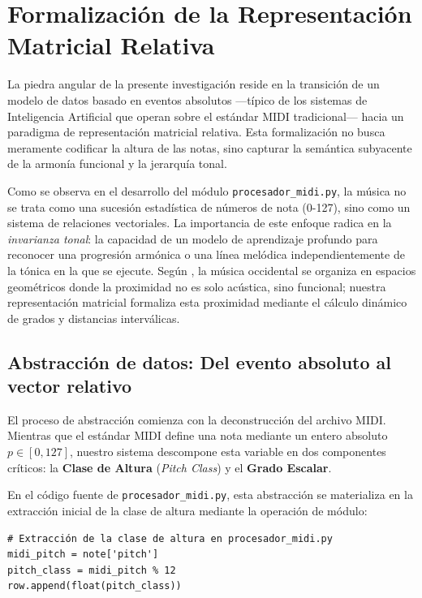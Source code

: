 \section{Formalización de la Representación Matricial Relativa}

La piedra angular de la presente investigación reside en la transición de un modelo de datos basado en eventos absolutos —típico de los sistemas de Inteligencia Artificial que operan sobre el estándar MIDI tradicional— hacia un paradigma de representación matricial relativa. Esta formalización no busca meramente codificar la altura de las notas, sino capturar la semántica subyacente de la armonía funcional y la jerarquía tonal. 

Como se observa en el desarrollo del módulo \texttt{procesador\_midi.py}, la música no se trata como una sucesión estadística de números de nota (0-127), sino como un sistema de relaciones vectoriales. La importancia de este enfoque radica en la \textit{invarianza tonal}: la capacidad de un modelo de aprendizaje profundo para reconocer una progresión armónica o una línea melódica independientemente de la tónica en la que se ejecute. Según \cite{tymoczko2011}, la música occidental se organiza en espacios geométricos donde la proximidad no es solo acústica, sino funcional; nuestra representación matricial formaliza esta proximidad mediante el cálculo dinámico de grados y distancias interválicas.

\subsection{Abstracción de datos: Del evento absoluto al vector relativo}

El proceso de abstracción comienza con la deconstrucción del archivo MIDI. Mientras que el estándar MIDI define una nota mediante un entero absoluto $p \in [0, 127]$, nuestro sistema descompone esta variable en dos componentes críticos: la \textbf{Clase de Altura} (\textit{Pitch Class}) y el \textbf{Grado Escalar}.

En el código fuente de \texttt{procesador\_midi.py}, esta abstracción se materializa en la extracción inicial de la clase de altura mediante la operación de módulo:

\begin{verbatim}
# Extracción de la clase de altura en procesador_midi.py
midi_pitch = note['pitch']
pitch_class = midi_pitch % 12
row.append(float(pitch_class))
\end{verbatim}

